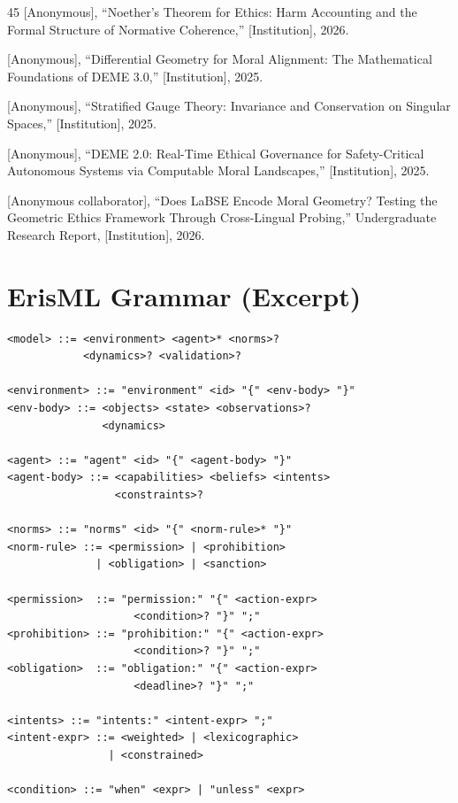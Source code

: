 \documentclass[conference]{IEEEtran}
\begin{document}
\begin{thebibliography}{45}
[Anonymous], ``Noether's Theorem for Ethics: Harm Accounting and the Formal Structure of Normative Coherence,'' [Institution], 2026.

[Anonymous], ``Differential Geometry for Moral Alignment: The Mathematical Foundations of DEME 3.0,'' [Institution], 2025.

[Anonymous], ``Stratified Gauge Theory: Invariance and Conservation on Singular Spaces,'' [Institution], 2025.

[Anonymous], ``DEME 2.0: Real-Time Ethical Governance for Safety-Critical Autonomous Systems via Computable Moral Landscapes,'' [Institution], 2025.

[Anonymous collaborator], ``Does LaBSE Encode Moral Geometry? Testing the Geometric Ethics Framework Through Cross-Lingual Probing,'' Undergraduate Research Report, [Institution], 2026.

\end{thebibliography}

\appendix

\section{ErisML Grammar (Excerpt)}
\label{app:grammar}

\begin{lstlisting}
<model> ::= <environment> <agent>* <norms>?
            <dynamics>? <validation>?

<environment> ::= "environment" <id> "{" <env-body> "}"
<env-body> ::= <objects> <state> <observations>?
               <dynamics>

<agent> ::= "agent" <id> "{" <agent-body> "}"
<agent-body> ::= <capabilities> <beliefs> <intents>
                 <constraints>?

<norms> ::= "norms" <id> "{" <norm-rule>* "}"
<norm-rule> ::= <permission> | <prohibition>
              | <obligation> | <sanction>

<permission>  ::= "permission:" "{" <action-expr>
                    <condition>? "}" ";"
<prohibition> ::= "prohibition:" "{" <action-expr>
                    <condition>? "}" ";"
<obligation>  ::= "obligation:" "{" <action-expr>
                    <deadline>? "}" ";"

<intents> ::= "intents:" <intent-expr> ";"
<intent-expr> ::= <weighted> | <lexicographic>
                | <constrained>

<condition> ::= "when" <expr> | "unless" <expr>
\end{lstlisting}
\end{document}
